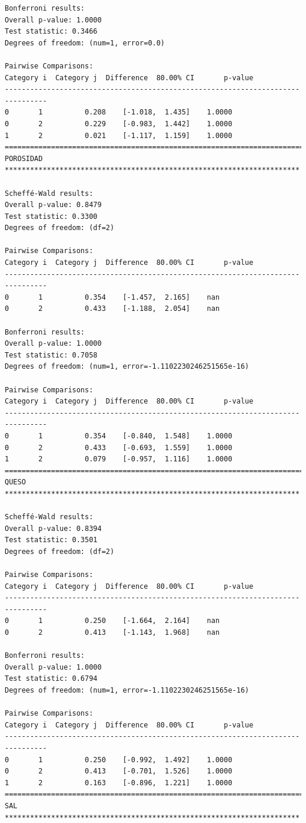 \begin{lstlisting}
Bonferroni results:
Overall p-value: 1.0000
Test statistic: 0.3466
Degrees of freedom: (num=1, error=0.0)

Pairwise Comparisons:
Category i  Category j  Difference  80.00% CI       p-value
--------------------------------------------------------------------------------
0       1          0.208    [-1.018,  1.435]    1.0000
0       2          0.229    [-0.983,  1.442]    1.0000
1       2          0.021    [-1.117,  1.159]    1.0000
================================================================================
POROSIDAD **********************************************************************

Scheffé-Wald results:
Overall p-value: 0.8479
Test statistic: 0.3300
Degrees of freedom: (df=2)

Pairwise Comparisons:
Category i  Category j  Difference  80.00% CI       p-value
--------------------------------------------------------------------------------
0       1          0.354    [-1.457,  2.165]    nan
0       2          0.433    [-1.188,  2.054]    nan

Bonferroni results:
Overall p-value: 1.0000
Test statistic: 0.7058
Degrees of freedom: (num=1, error=-1.1102230246251565e-16)

Pairwise Comparisons:
Category i  Category j  Difference  80.00% CI       p-value
--------------------------------------------------------------------------------
0       1          0.354    [-0.840,  1.548]    1.0000
0       2          0.433    [-0.693,  1.559]    1.0000
1       2          0.079    [-0.957,  1.116]    1.0000
================================================================================
QUESO **********************************************************************

Scheffé-Wald results:
Overall p-value: 0.8394
Test statistic: 0.3501
Degrees of freedom: (df=2)

Pairwise Comparisons:
Category i  Category j  Difference  80.00% CI       p-value
--------------------------------------------------------------------------------
0       1          0.250    [-1.664,  2.164]    nan
0       2          0.413    [-1.143,  1.968]    nan

Bonferroni results:
Overall p-value: 1.0000
Test statistic: 0.6794
Degrees of freedom: (num=1, error=-1.1102230246251565e-16)

Pairwise Comparisons:
Category i  Category j  Difference  80.00% CI       p-value
--------------------------------------------------------------------------------
0       1          0.250    [-0.992,  1.492]    1.0000
0       2          0.413    [-0.701,  1.526]    1.0000
1       2          0.163    [-0.896,  1.221]    1.0000
================================================================================
SAL **********************************************************************


\end{lstlisting}
